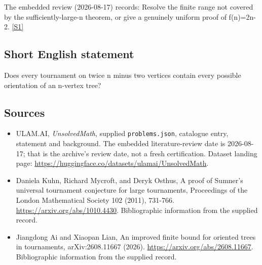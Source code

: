 \documentclass[11pt,a4paper]{article}
\newcommand{\sref}[2]{\hyperlink{source:#1:#2}{[S#2]}}
\begin{document}
The embedded review (2026-08-17) records: Resolve the finite range not covered by the sufficiently-large-n theorem, or give a genuinely uniform proof of f(n)=2n-2. \sref{statement}{1}

\subsection{Short English statement}

Does every tournament on twice n minus two vertices contain every possible orientation of an n-vertex tree?

\subsection{Sources}

{\small

\begin{itemize}

\item[\hypertarget{source:statement:1}{S1}] ULAM.AI, \emph{UnsolvedMath}, supplied \texttt{problems.json}, catalogue entry, statement and background. The embedded literature-review date is 2026-08-17; that is the archive’s review date, not a fresh certification. Dataset landing page: \url{https://huggingface.co/datasets/ulamai/UnsolvedMath}.

\item[\hypertarget{source:statement:2}{S2}] Daniela Kuhn, Richard Mycroft, and Deryk Osthus, A proof of Sumner's universal tournament conjecture for large tournaments, Proceedings of the London Mathematical Society 102 (2011), 731-766. \url{https://arxiv.org/abs/1010.4430}. Bibliographic information from the supplied record.

\item[\hypertarget{source:statement:3}{S3}] Jiangdong Ai and Xiaopan Lian, An improved finite bound for oriented trees in tournaments, arXiv:2608.11667 (2026). \url{https://arxiv.org/abs/2608.11667}. Bibliographic information from the supplied record.

\end{itemize}

}

\label{end:statement}
\end{document}
